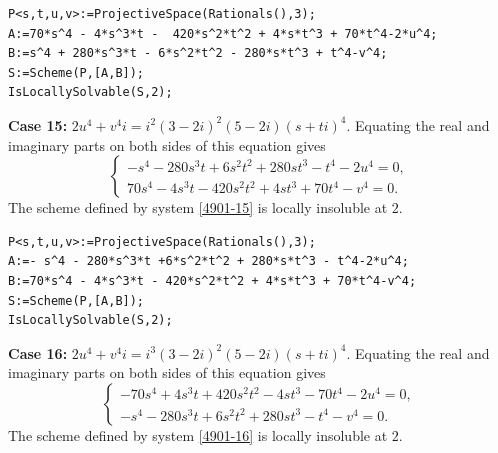 \documentclass[a4paper,12pt,english,reqno]{amsart}
\begin{document}

\begin{lstlisting}
P<s,t,u,v>:=ProjectiveSpace(Rationals(),3);
A:=70*s^4 - 4*s^3*t -  420*s^2*t^2 + 4*s*t^3 + 70*t^4-2*u^4;
B:=s^4 + 280*s^3*t - 6*s^2*t^2 - 280*s*t^3 + t^4-v^4;
S:=Scheme(P,[A,B]);
IsLocallySolvable(S,2);
\end{lstlisting}


{\bf Case 15:} $2u^4+v^4i=i^2(3- 2i)^2(5-2i)(s+ti)^4$.  Equating the real and imaginary parts on both sides of this equation gives
\begin{equation}\label{4901-15}
\begin{cases}
-s^4 - 280s^3t + 6s^2t^2 + 280st^3 - t^4 - 2u^4=0,\\
70s^4 - 4s^3t - 420s^2t^2 + 4st^3 + 70t^4 - v^4=0.
\end{cases}
\end{equation}
The scheme defined by system \eqref{4901-15} is locally insoluble at $2$.

\begin{lstlisting}
P<s,t,u,v>:=ProjectiveSpace(Rationals(),3);
A:=- s^4 - 280*s^3*t +6*s^2*t^2 + 280*s*t^3 - t^4-2*u^4;
B:=70*s^4 - 4*s^3*t - 420*s^2*t^2 + 4*s*t^3 + 70*t^4-v^4;
S:=Scheme(P,[A,B]);
IsLocallySolvable(S,2);
\end{lstlisting}

{\bf Case 16:} $2u^4+v^4i=i^3(3- 2i)^2(5-2i)(s+ti)^4$.  Equating the real and imaginary parts on both sides of this equation gives
\begin{equation}\label{4901-16}
\begin{cases}
-70s^4 + 4s^3t + 420s^2t^2 - 4st^3 - 70t^4 - 2u^4=0,\\
-s^4 - 280s^3t + 6s^2t^2 + 280st^3 - t^4 - v^4=0.
\end{cases}
\end{equation}
The scheme defined by system \eqref{4901-16} is locally insoluble at $2$.
\end{document}

